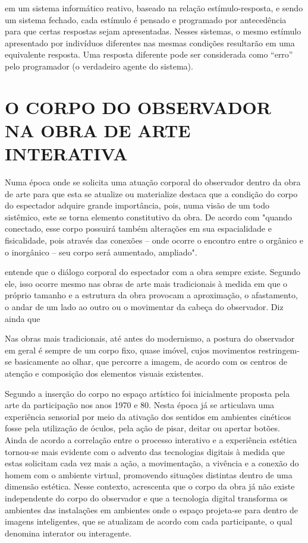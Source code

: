 em um sistema informático reativo,
baseado na relação estímulo-resposta, e sendo um sistema fechado, cada estímulo é
pensado e programado por antecedência para que certas respostas sejam apresentadas.
Nesses sistemas, o mesmo estímulo apresentado por indivíduos diferentes nas mesmas
condições resultarão em uma equivalente resposta. Uma resposta diferente pode ser
considerada como “erro” pelo programador (o verdadeiro agente do sistema).


\section{O CORPO DO OBSERVADOR NA OBRA DE ARTE INTERATIVA}
	
Numa época onde se solicita uma atuação corporal do observador dentro da obra de arte para que esta se atualize ou materialize  destaca que a condição do corpo do espectador adquire grande importância, pois, numa visão de um todo sistêmico, este se torna elemento constitutivo da obra. De acordo com  "quando conectado, esse corpo possuirá também alterações em sua espacialidade e fisicalidade, pois através das conexões – onde ocorre o encontro entre o orgânico e o inorgânico – seu corpo será aumentado, ampliado".
	
 entende que o diálogo corporal do espectador com a obra sempre existe. Segundo ele, isso ocorre mesmo nas obras de arte mais tradicionais à medida em que o próprio tamanho e a estrutura da obra provocam a aproximação, o afastamento, o andar de um lado ao outro ou o movimentar da cabeça do observador. Diz ainda que

\begin{citacao}
Nas obras mais tradicionais, até antes do modernismo, a postura do observador em geral é sempre de um corpo fixo, quase imóvel, cujos movimentos restringem-se basicamente ao olhar, que percorre a imagem, de acordo com os centros de atenção e composição dos elementos visuais existentes. \cite{sogabe} 
\end{citacao}

Segundo  a inserção do corpo no espaço artístico foi inicialmente proposta pela arte da participação nos anos 1970 e 80. Nesta época já se articulava uma experiência sensorial por meio da ativação dos sentidos em ambientes cinéticos fosse pela utilização de óculos, pela ação de pisar, deitar ou apertar botões. Ainda de acordo  a correlação entre o processo interativo e a experiência estética tornou-se mais evidente com o advento das tecnologias digitais à medida que estas solicitam cada vez mais a ação, a movimentação, a vivência e a conexão do homem com o ambiente virtual, promovendo situações distintas dentro de uma dimensão estética. Nesse contexto,  acrescenta que o corpo da obra já não existe independente do corpo do observador e que a tecnologia digital transforma os ambientes das instalações em ambientes onde o espaço projeta-se para dentro de imagens inteligentes, que se atualizam de acordo com cada participante, o qual denomina interator ou interagente.

